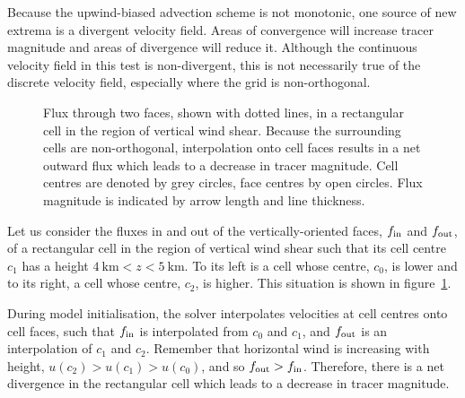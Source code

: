 Because the upwind-biased advection scheme is not monotonic, one source of new extrema is a divergent velocity field.  Areas of convergence will increase tracer magnitude and areas of divergence will reduce it.  Although the continuous velocity field in this test is non-divergent, this is not necessarily true of the discrete velocity field, especially where the grid is non-orthogonal.

\begin{figure}
	\centering
	
	\caption{Flux through two faces, shown with dotted lines, in a rectangular cell in the region of vertical wind shear.  Because the surrounding cells are non-orthogonal, interpolation onto cell faces results in a net outward flux which leads to a decrease in tracer magnitude.  Cell centres are denoted by grey circles, face centres by open circles.  Flux magnitude is indicated by arrow length and line thickness.}
	\label{fig:advection:flux}
\end{figure}

Let us consider the fluxes in and out of the vertically-oriented faces, $f_\mathrm{in}$ and $f_\mathrm{out}$, of a rectangular cell in the region of vertical wind shear such that its cell centre $c_1$ has a height $\SI{4}{\kilo\meter} < z < \SI{5}{\kilo\meter}$.  To its left is a cell whose centre, $c_0$, is lower and to its right, a cell whose centre, $c_2$, is higher.  This situation is shown in figure~\ref{fig:advection:flux}.

During model initialisation, the solver interpolates velocities at cell centres onto cell faces, such that $f_\mathrm{in}$ is interpolated from $c_0$ and $c_1$, and $f_\mathrm{out}$ is an interpolation of $c_1$ and $c_2$.  Remember that horizontal wind is increasing with height, $u(c_2) > u(c_1) > u(c_0)$, and so $f_\mathrm{out} > f_\mathrm{in}$.  Therefore, there is a net divergence in the rectangular cell which leads to a decrease in tracer magnitude.


